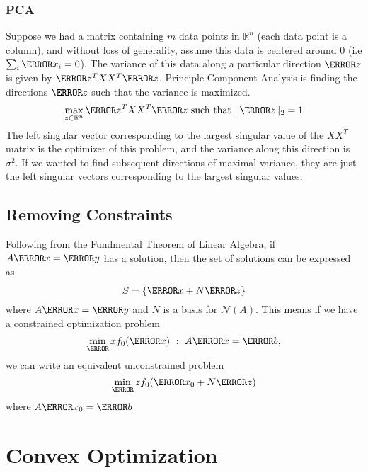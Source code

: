 \subsubsection{PCA}
Suppose we had a matrix containing $m$ data points in $\mathbb{R}^n$ (each data point is a column), and without loss of generality, assume this data is centered around 0 (i.e $\sum_i \V{x}_i = 0$).
The variance of this data along a particular direction $\V{z}$ is given by $\V{z}^TXX^T\V{z}$.
Principle Component Analysis is finding the directions $\V{z}$ such that the variance is maximized.
\[
	\max_{z\in\mathbb{R}^n} \V{z}^TXX^T\V{z} \text{ such that } \|\V{z}\|_2 = 1
\]
The left singular vector corresponding to the largest singular value of the $XX^T$ matrix is the optimizer of this problem, and the variance along this direction is $\sigma_1^2$.
If we wanted to find subsequent directions of maximal variance, they are just the left singular vectors corresponding to the largest singular values.
\subsection{Removing Constraints}
Following from the Fundmental Theorem of Linear Algebra, if $A\V{x}=\V{y}$ has a solution, then the set of solutions can be expressed as
\[
	S = \{\bar{\V{x}} + N\V{z}\}
\]
where $A\bar{\V{x}}=\V{y}$ and $N$ is a basis for $\mathcal{N}(A)$.
This means if we have a constrained optimization problem
\[
	\min_\V{x} f_0(\V{x}) \ : \ A\V{x} = \V{b},
\]
we can write an equivalent unconstrained problem \[
	\min_\V{z} f_0(\V{x}_0 + N\V{z})
\]
where $A\V{x}_0 = \V{b}$
\section{Convex Optimization}
